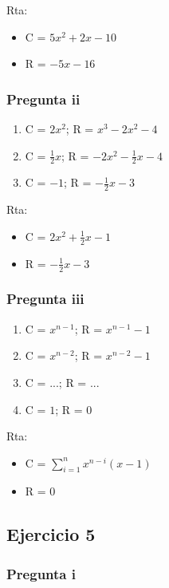 Rta: \begin{itemize}
    \item C = $ 5x^2 + 2x - 10 $
    \item R = $ -5x-16 $
\end{itemize}

\subsubsection{Pregunta ii}

\begin{enumerate}
    \item C = $ 2x^2 $; R = $ x^3-2x^2-4 $ 
    \item C = $ \frac{1}{2}x $; R = $ -2x^2 - \frac{1}{2}x - 4 $ 
    \item C = $ -1 $; R = $ -\frac{1}{2}x - 3 $ 
\end{enumerate}

Rta: \begin{itemize}
    \item C = $ 2x^2 + \frac{1}{2}x - 1 $
    \item R = $ -\frac{1}{2}x - 3 $
\end{itemize}

\subsubsection{Pregunta iii}

\begin{enumerate}
    \item C = $ x^{n-1} $; R = $ x^{n-1} - 1 $ 
    \item C = $ x^{n-2} $; R = $ x^{n-2} - 1 $ 
    \item C = $ ... $; R = $ ... $ 
    \item C = $ 1 $; R = $ 0 $ 
\end{enumerate}

Rta: \begin{itemize}
    \item C = $ \sum_{i = 1}^{n}x^{n-i}(x-1) $
    \item R = $ 0 $
\end{itemize}

\subsection{Ejercicio 5}

\subsubsection{Pregunta i}

